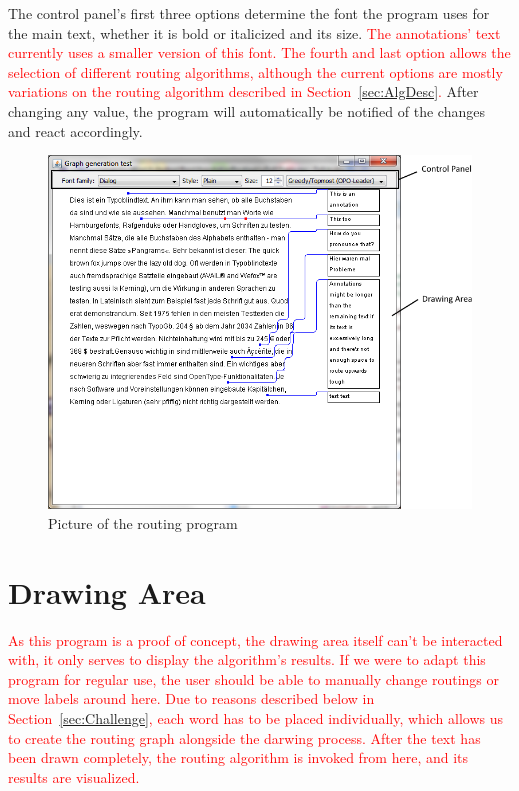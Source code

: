 \documentclass[11pt,a4paper]{vutinfth}
\newcommand{\change}[1]{\textcolor{red}{#1}}
\begin{document}
The control panel's first three options determine the font the program uses for the main text, whether it is bold or italicized and its size. \change{The annotations' text currently uses a smaller version of this font. The fourth and last option allows the selection of different routing algorithms, although the current options are mostly variations on the routing algorithm described in Section~\ref*{sec:AlgDesc}.} After changing any value, the program will automatically be notified of the changes and react accordingly.

\begin{figure}%
	\captionsetup{justification=centering, margin=0.75cm}
	\centering
	\includegraphics[scale=0.75]{ProgramWindowAnnotated.png}
	\caption{Picture of the routing program}
	\label{fig:ProgWindow}
\end{figure}

\section{Drawing Area}
\change{As this program is a proof of concept, the drawing area itself can't be interacted with, it only serves to display the algorithm's results. If we were to adapt this program for regular use, the user should be able to manually change routings or move labels around here.
Due to reasons described below in Section~\ref*{sec:Challenge}, each word has to be placed individually, which allows us to create the routing graph alongside the darwing process. 
After the text has been drawn completely, the routing algorithm is invoked from here, and its results are visualized.}
\end{document}
